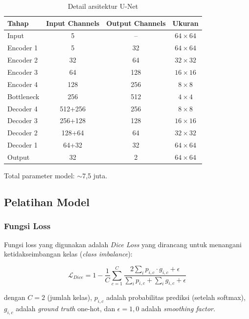 \documentclass[12pt,a4paper]{article}
\begin{document}
\begin{table}[H]
\centering
\caption{Detail arsitektur U-Net}
\label{tab:unet_arch}
\begin{tabular}{lccc}
\toprule
\textbf{Tahap} & \textbf{Input Channels} & \textbf{Output Channels} & \textbf{Ukuran} \\
\midrule
Input & 5 & -- & $64 \times 64$ \\
Encoder 1 & 5 & 32 & $64 \times 64$ \\
Encoder 2 & 32 & 64 & $32 \times 32$ \\
Encoder 3 & 64 & 128 & $16 \times 16$ \\
Encoder 4 & 128 & 256 & $8 \times 8$ \\
Bottleneck & 256 & 512 & $4 \times 4$ \\
Decoder 4 & 512+256 & 256 & $8 \times 8$ \\
Decoder 3 & 256+128 & 128 & $16 \times 16$ \\
Decoder 2 & 128+64 & 64 & $32 \times 32$ \\
Decoder 1 & 64+32 & 32 & $64 \times 64$ \\
Output & 32 & 2 & $64 \times 64$ \\
\bottomrule
\end{tabular}
\end{table}

Total parameter model: $\sim$7,5 juta.

\subsection{Pelatihan Model}

\subsubsection{Fungsi Loss}

Fungsi loss yang digunakan adalah \textit{Dice Loss} yang dirancang untuk 
menangani ketidakseimbangan kelas (\textit{class imbalance}):

\begin{equation}
    \label{eq:dice_loss}
    \mathcal{L}_{Dice} = 1 - \frac{1}{C} \sum_{c=1}^{C} 
    \frac{2 \sum_{i} p_{i,c} \cdot g_{i,c} + \epsilon}{\sum_{i} p_{i,c} + \sum_{i} g_{i,c} + \epsilon}
\end{equation}

dengan $C=2$ (jumlah kelas), $p_{i,c}$ adalah probabilitas prediksi 
(setelah softmax), $g_{i,c}$ adalah \textit{ground truth} one-hot, 
dan $\epsilon = 1,0$ adalah \textit{smoothing factor}.
\end{document}
